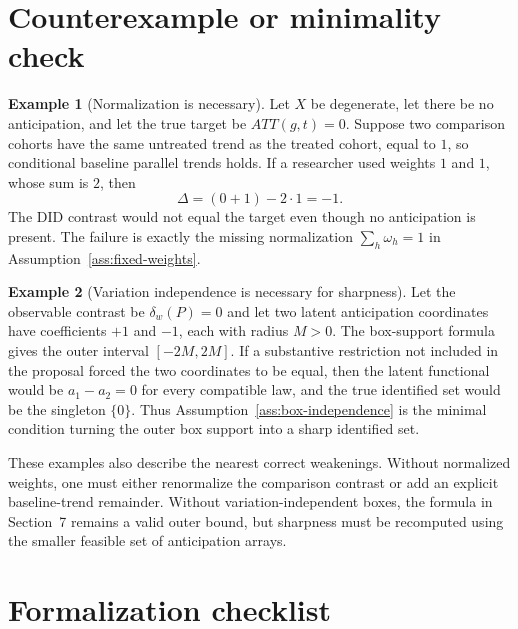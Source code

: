 \documentclass[11pt]{article}
\theoremstyle{definition}
\newtheorem{example}{Example}
\theoremstyle{plain}
\theoremstyle{remark}
\begin{document}
\section{Counterexample or minimality check}
\begin{example}[Normalization is necessary]\label{ex:normalization}
Let \(X\) be degenerate, let there be no anticipation, and let the true target be
\(ATT(g,t)=0\).  Suppose two comparison cohorts have the same untreated trend as
the treated cohort, equal to \(1\), so conditional baseline parallel trends holds.
If a researcher used weights \(1\) and \(1\), whose sum is \(2\), then
\[
  \Delta=(0+1)-2\cdot 1=-1.
\]
The DID contrast would not equal the target even though no anticipation is
present.  The failure is exactly the missing normalization
\(\sum_h\omega_h=1\) in Assumption~\ref{ass:fixed-weights}.
\end{example}

\begin{example}[Variation independence is necessary for sharpness]\label{ex:box-independence}
Let the observable contrast be \(\delta_w(P)=0\) and let two latent anticipation
coordinates have coefficients \(+1\) and \(-1\), each with radius \(M>0\).  The
box-support formula gives the outer interval \([-2M,2M]\).  If a substantive
restriction not included in the proposal forced the two coordinates to be equal,
then the latent functional would be \(a_1-a_2=0\) for every compatible law, and
the true identified set would be the singleton \(\{0\}\).  Thus
Assumption~\ref{ass:box-independence} is the minimal condition turning the outer
box support into a sharp identified set.
\end{example}

These examples also describe the nearest correct weakenings.  Without normalized
weights, one must either renormalize the comparison contrast or add an explicit
baseline-trend remainder.  Without variation-independent boxes, the formula in
Section~7 remains a valid outer bound, but sharpness must be recomputed using the
smaller feasible set of anticipation arrays.

\section{Formalization checklist}
\end{document}
